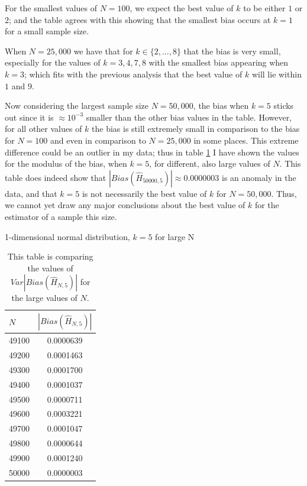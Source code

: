 \documentclass{report}
\begin{document}
For the smallest values of $N=100$, we expect the best value of $k$ to be either $1$ or $2$; and the table agrees with this showing that the smallest bias occurs at $k=1$ for a small sample size. 

When $N=25,000$ we have that for $k \in \{2,..., 8\}$ that the bias is very small, especially for the values of $k=3, 4, 7, 8$ with the smallest bias appearing when $k=3$; which fits with the previous analysis that the best value of $k$ will lie within $1$ and $9$.

Now considering the largest sample size $N=50,000$, the bias when $k=5$ sticks out since it is $\approx 10^{-3}$ smaller than the other bias values in the table. However, for all other values of $k$ the bias is still extremely small in comparison to the bias for $N=100$ and even in comparison to $N=25,000$ in some places. This extreme difference could be an outlier in my data; thus in table \ref{normal_k5_table} I have shown the values for the modulus of the bias, when $k=5$, for different, also large values of $N$. This table does indeed show that $|Bias(\hat{H}_{50000, 5})| \approx 0.0000003$ is an anomaly in the data, and that $k=5$ is not necessarily the best value of $k$ for $N=50,000$. Thus, we cannot yet draw any major conclusions about the best value of $k$ for the estimator of a sample this size.

\begin{table}
\caption{1-dimensional normal distribution, $k=5$ for large N} \label{normal_k5_table}
\begin{center}
\begin{tabular}{| l | c |} 
\toprule
$N$ &  $|Bias(\hat{H}_{N, 5})|$ \\
\midrule[1pt]
49100    & 0.0000639   \\
49200    & 0.0001463   \\
49300    & 0.0001700   \\
49400    & 0.0001037   \\
49500    & 0.0000711   \\
49600    & 0.0003221   \\
49700    & 0.0001047   \\
49800    & 0.0000644   \\
49900    & 0.0001240   \\
50000    & 0.0000003   \\
\hline
\end{tabular}
\\[10pt]
\caption*{This table is comparing the values of $Var|Bias(\hat{H}_{N, 5})|$ for the large values of $N$.}
\end{center}
\end{table}
\end{document}
